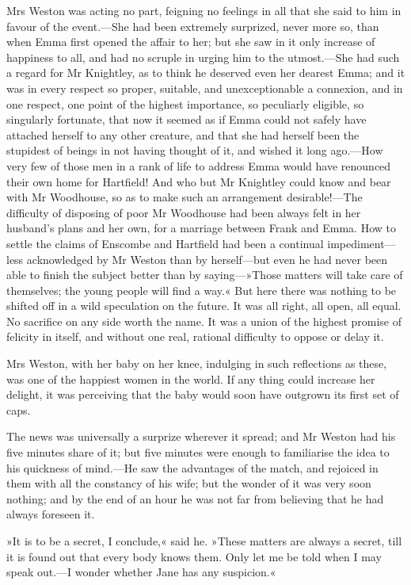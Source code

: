 Mrs Weston was acting no part, feigning no feelings in all that she said to him in favour of the event.—She had been extremely surprized, never more so, than when Emma first opened the affair to her; but she saw in it only increase of happiness to all, and had no scruple in urging him to the utmost.—She had such a regard for Mr Knightley, as to think he deserved even her dearest Emma; and it was in every respect so proper, suitable, and unexceptionable a connexion, and in one respect, one point of the highest importance, so peculiarly eligible, so singularly fortunate, that now it seemed as if Emma could not safely have attached herself to any other creature, and that she had herself been the stupidest of beings in not having thought of it, and wished it long ago.—How very few of those men in a rank of life to address Emma would have renounced their own home for Hartfield! And who but Mr Knightley could know and bear with Mr Woodhouse, so as to make such an arrangement desirable!—The difficulty of disposing of poor Mr Woodhouse had been always felt in her husband's plans and her own, for a marriage between Frank and Emma. How to settle the claims of Enscombe and Hartfield had been a continual impediment—less acknowledged by Mr Weston than by herself—but even he had never been able to finish the subject better than by saying—»Those matters will take care of themselves; the young people will find a way.« But here there was nothing to be shifted off in a wild speculation on the future. It was all right, all open, all equal. No sacrifice on any side worth the name. It was a union of the highest promise of felicity in itself, and without one real, rational difficulty to oppose or delay it.

Mrs Weston, with her baby on her knee, indulging in such reflections as these, was one of the happiest women in the world. If any thing could increase her delight, it was perceiving that the baby would soon have outgrown its first set of caps.

The news was universally a surprize wherever it spread; and Mr Weston had his five minutes share of it; but five minutes were enough to familiarise the idea to his quickness of mind.—He saw the advantages of the match, and rejoiced in them with all the constancy of his wife; but the wonder of it was very soon nothing; and by the end of an hour he was not far from believing that he had always foreseen it.

»It is to be a secret, I conclude,« said he. »These matters are always a secret, till it is found out that every body knows them. Only let me be told when I may speak out.—I wonder whether Jane has any suspicion.«

